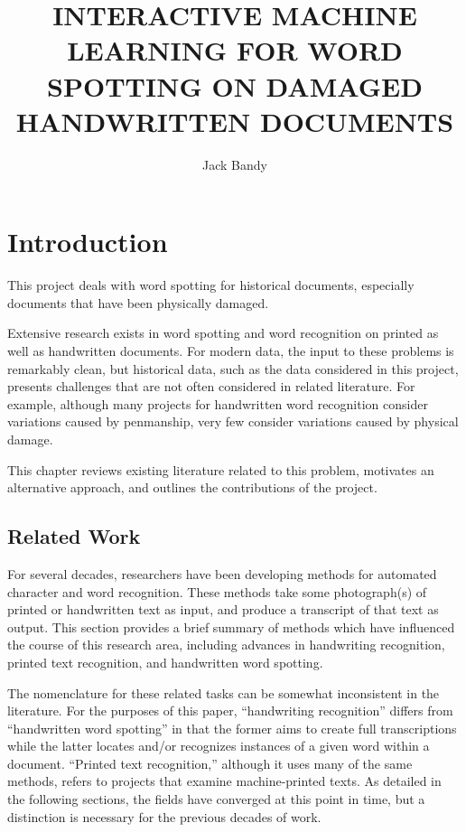 \documentclass[final]{ukthesis}
\begin{document}
\author{Jack Bandy}
\title{INTERACTIVE MACHINE LEARNING FOR WORD SPOTTING ON DAMAGED HANDWRITTEN DOCUMENTS}
\frontmatter
\maketitle

\tableofcontents\clearpage
\listoffigures\clearpage
\listoftables\clearpage
\mainmatter


%
%
%
\chapter{Introduction}

This project deals with word spotting for historical documents, especially documents that have been physically damaged.

Extensive research exists in word spotting and word recognition on printed as well as handwritten documents. For modern data, the input to these problems is remarkably clean, but historical data, such as the data considered in this project, presents challenges that are not often considered in related literature. For example, although many projects for handwritten word recognition consider variations caused by penmanship, very few consider variations caused by physical damage.

This chapter reviews existing literature related to this problem, motivates an alternative approach, and outlines the contributions of the project.

%
%
\section{Related Work}
For several decades, researchers have been developing methods for automated character and word recognition. These methods take some photograph(s) of printed or handwritten text as input, and produce a transcript of that text as output. This section provides a brief summary of methods which have influenced the course of this research area, including advances in handwriting recognition, printed text recognition, and handwritten word spotting.

The nomenclature for these related tasks can be somewhat inconsistent in the literature. For the purposes of this paper, ``handwriting recognition'' differs from ``handwritten word spotting'' in that the former aims to create full transcriptions while the latter locates and/or recognizes instances of a given word within a document. ``Printed text recognition,'' although it uses many of the same methods, refers to projects that examine machine-printed texts. As detailed in the following sections, the fields have converged at this point in time, but a distinction is necessary for the previous decades of work.
\end{document}

